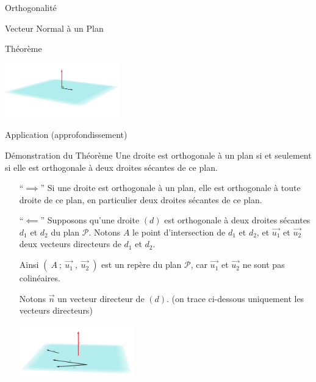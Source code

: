 \documentclass{cours}
\begin{document}
\begin{Gpartie}{Orthogonalité}
\begin{Spartie}{Vecteur Normal à un Plan}
\begin{SSpartie}{Théorème}
                \begin{center}
                    \includegraphics[width=5cm]{rsc/12fig5.png}
                    \parbox{\linewidth}{}
                \end{center}
            \end{SSpartie}
        \end{Spartie}
        \begin{Spartie}{Application (approfondissement)} 
            \begin{SSpartie}{Démonstration du Théorème} 
                \og Une droite est orthogonale à un plan si et seulement si elle est orthogonale à deux droites sécantes de ce plan. \fg
                \begin{itemize}[leftmargin=7ex]
                    \item[``$\implies$''] Si une droite est orthogonale à un plan, elle est orthogonale à toute droite de ce plan, en particulier deux droites sécantes de ce plan.
                    \item[``$\impliedby$''] Supposons qu'une droite $(d)$ est orthogonale à deux droites sécantes $d_1$ et $d_2$ du plan $\mathcal{P}$. Notons $A$ le point d'intersection de $d_1$ et $d_2$, et $\vec{u_1}$ et $\vec{u_2}$ deux vecteurs directeurs de $d_1$ et $d_2$.

                    Ainsi $\left(~A~;~\vec{u_1}~,~\vec{u_2}~\right)$ est un repère du plan $\mathcal{P}$, car $\vec{u_1}$ et $\vec{u_2}$ ne sont pas colinéaires.

                    Notons $\vec{n}$ un vecteur directeur de $(d)$. (on trace ci-dessous uniquement les vecteurs directeurs)
                    \vspace{-0.2ex}
                    \begin{center}
                        \includegraphics[width=5cm]{rsc/12fig6.png}
                        \parbox{\linewidth}{}
                    \end{center}
    

\end{itemize}
\end{SSpartie}
\end{Spartie}
\end{Gpartie}
\end{document}
